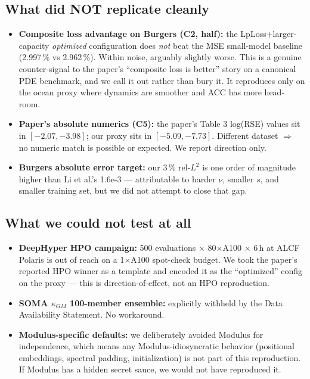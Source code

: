 \documentclass[11pt]{article}
\begin{document}
\subsection*{What did NOT replicate cleanly}
\begin{itemize}
  \item \textbf{Composite loss advantage on Burgers (C2, half):} the LpLoss$+$larger-capacity
        \emph{optimized} configuration does \emph{not} beat the MSE small-model baseline
        (2.997\,\% vs 2.962\,\%). Within noise, arguably slightly worse. This is a genuine
        counter-signal to the paper's ``composite loss is better'' story on a canonical PDE
        benchmark, and we call it out rather than bury it. It reproduces only on the ocean
        proxy where dynamics are smoother and ACC has more head-room.
  \item \textbf{Paper's absolute numerics (C5):} the paper's Table 3 log(RSE) values sit in
        $[-2.07,-3.98]$; our proxy sits in $[-5.09,-7.73]$. Different dataset $\Rightarrow$
        no numeric match is possible or expected. We report direction only.
  \item \textbf{Burgers absolute error target:} our 3\,\% rel-$L^2$ is one order of magnitude
        higher than Li et al.'s 1.6e-3 --- attributable to harder $\nu$, smaller $s$, and
        smaller training set, but we did not attempt to close that gap.
\end{itemize}

\subsection*{What we could not test at all}
\begin{itemize}
  \item \textbf{DeepHyper HPO campaign:} 500 evaluations $\times$ 80$\times$A100 $\times$ 6\,h at
        ALCF Polaris is out of reach on a 1$\times$A100 spot-check budget. We took the
        paper's reported HPO winner as a template and encoded it as the ``optimized'' config
        on the proxy --- this is direction-of-effect, not an HPO reproduction.
  \item \textbf{SOMA $\kappa_{GM}$ 100-member ensemble:} explicitly withheld by the Data
        Availability Statement. No workaround.
  \item \textbf{Modulus-specific defaults:} we deliberately avoided Modulus for independence,
        which means any Modulus-idiosyncratic behavior (positional embeddings, spectral
        padding, initialization) is not part of this reproduction. If Modulus has a hidden
        secret sauce, we would not have reproduced it.
\end{itemize}
\end{document}
